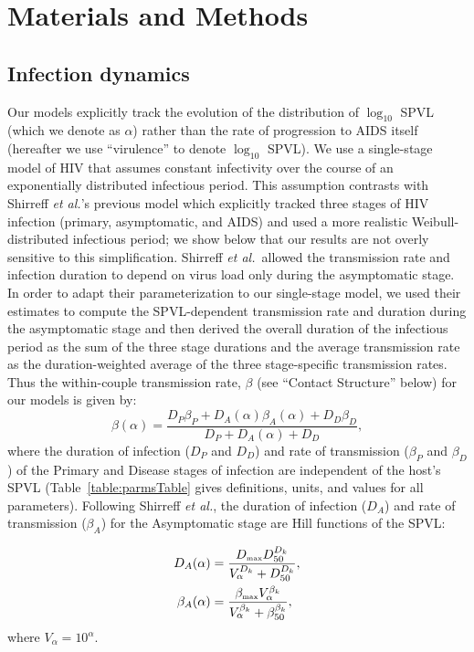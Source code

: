 \documentclass[10pt,letterpaper]{article}
\newcommand{\Lspvl}{$\log_{10}$ SPVL}
\newcommand{\etal}{\textit{et al.}}
\newcommand{\tsub}[2]{#1_{{\textrm{\tiny #2}}}}
\begin{document}
\section*{Materials and Methods}

\subsection*{Infection dynamics}

Our models
explicitly track the evolution of the distribution of $\log_{10}$ SPVL
(which we denote as $\alpha$)
rather than the rate of progression to
AIDS itself (hereafter we use ``virulence'' to denote \Lspvl).
We use a single-stage model of HIV that assumes constant
infectivity over the course of an exponentially
distributed infectious period. This assumption contrasts
with Shirreff \etal's previous model which
explicitly tracked three stages of HIV infection (primary,
asymptomatic, and AIDS) and used a more realistic
Weibull-distributed infectious period; we show below that our results
are not overly sensitive to this simplification. 
Shirreff \etal\ allowed the transmission rate
and infection duration to depend on virus load only during the
asymptomatic stage. In order to adapt their parameterization to our
single-stage model, we used their estimates to compute the SPVL-dependent transmission
rate and duration during the asymptomatic stage and 
then derived the overall duration of the infectious period
as the sum of the three stage durations and the 
average transmission rate as the duration-weighted 
average of the three stage-specific transmission rates. 
Thus the within-couple transmission rate, $\beta$
(see ``Contact Structure'' below)
for our models is given by:
\begin{equation}
\beta (\alpha) = \frac{D_P \beta_P + D_A (\alpha) \beta_A (\alpha) + D_D \beta_D}{D_P + D_A (\alpha) + D_D},
\end{equation}
where the duration of infection ($D_P$ and $D_D$) and rate of transmission ($\beta_P$ and $\beta_D$) of the Primary and Disease stages
of infection are independent of the host's SPVL
(Table~\ref{table:parmsTable} gives definitions, units, and values for all parameters).
Following Shirreff \etal, the duration of infection ($D_A$) and rate of transmission ($\beta_A$) for the Asymptomatic stage are Hill functions of the SPVL:

\begin{equation}
\begin{split}
D_A(\alpha) &= \frac{\tsub{D}{max} D_{50} ^{D_k}}{V_\alpha ^{D_k} + D_{50}^{D_k}}, \\
\beta_A(\alpha) &= \frac{\tsub{\beta}{max} V_\alpha ^ {\beta_k}}%
{V_\alpha^{\beta_k} + \beta_{50} ^{\beta_k}},
\end{split}
\label{eq:hillfuns}
\end{equation}
where $V_{\alpha} = 10^\alpha$. 
\end{document}
